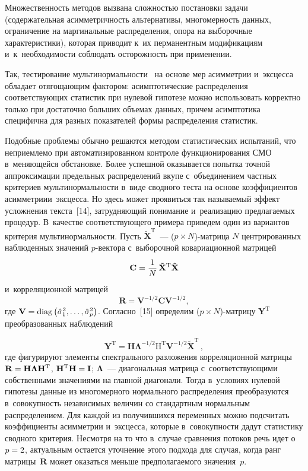 \begin{multicols}{2}
     Множественность методов вызвана сложностью постановки задачи 
(содержательная асим\-мет\-рич\-ность альтернативы, мно\-го\-мер\-ность данных, 
ограничение на маргинальные распределения, опора на выборочные 
характеристики), которая приводит к~их перманентным модификациям 
и~к~не\-об\-хо\-ди\-мости соблюдать осторожность при применении. 
     
     Так, тестирование муль\-ти\-нор\-маль\-ности~\cite[с.~5047--5051]{8-kri} на 
основе мер асим\-мет\-рии и~эксцесса обладает отя\-го\-ща\-ющим фактором: 
асимп\-то\-ти\-че\-ские распределения со\-от\-вет\-ст\-ву\-ющих статистик при нулевой 
гипотезе можно использовать корректно только при достаточно больших объемах 
данных, причем асимптотика специфична для разных показателей формы 
распределения статистик. 
     
     Подобные проблемы обычно решаются методом статистических испытаний, 
что неприемлемо при автоматизированном контроле функционирования СМО 
в~меняющейся обстановке. Более успешной оказывается попытка точной 
аппроксимации предельных распределений вкупе с~объединением частных 
критериев муль\-ти\-нор\-маль\-ности в~виде сводного тес\-та на основе коэффициентов 
асим\-мет\-рии\linebreak и~эксцесса. Но здесь может проявиться так называемый эффект 
услож\-не\-ния текс\-та~[14], за\-труд\-ня\-ющий понимание и~реализацию пред\-ла\-га\-емых 
процедур. В~качестве соответствующего примера \mbox{приведем} один из вариантов 
критерия мультинормальности. Пусть $\tilde{\mathbf{X}}^{\mathrm{T}}$~---  
($p\times N$)-мат\-ри\-ца $N$ центрированных наблюденных значений  
$p$-век\-то\-ра с~выборочной ковариационной матрицей 
$$
\mathbf{C}= \displaystyle\frac{\displaystyle 1\mathstrut}{\displaystyle N\mathstrut} \,\tilde{\mathbf{X}}^{\mathrm{T}}\tilde{\mathbf{X}}$$ 
и~корреляционной матрицей 
$$
\mathbf{R}= \mathbf{V}^{-1/2} \mathbf{CV}^{-1/2},
$$
 где $\mathbf{V}\hm= 
\mathrm{diag}\left( \hat{\sigma}^2_1, \ldots , \hat{\sigma}^2_p\right)$.
Согласно~[15] определим ($p\times N$)-мат\-ри\-цу $\mathbf{Y}^{\mathrm{T}}$ 
преобразованных наблюдений 

\noindent
$$
\mathbf{Y}^{\mathrm{T}}= \mathbf{H}\bm{\Lambda}^{-1/2} \mathrm{H}^{\mathrm{T}} \mathbf{V}^{-1/2} 
\tilde{\mathbf{X}}^{\mathrm{T}}\,,
$$
где фигурируют элементы спектрального разложения корреляционной матрицы 
$\mathbf{R}\hm= \mathbf{H}\bm{\Lambda} \mathbf{H}^{\mathrm{T}}$, 
$\mathbf{H}^{\mathrm{T}}\mathbf{H}\hm= \mathbf{I}$; $\bm{\Lambda}$~--- диагональная 
матрица с~со\-от\-вет\-ст\-ву\-ющи\-ми собственными значениями на глав\-ной диа\-го\-на\-ли. 
Тогда в~условиях нулевой гипотезы данные из многомерного нормального 
распределения преобразуются в~со\-во\-куп\-ность независимых величин со 
стандартным нормальным распределением. Для каждой из по\-лу\-чив\-ших\-ся 
переменных можно подсчитать коэффициенты асимметрии и~эксцесса, которые 
в~со\-во\-куп\-ности дадут статистику сводного критерия. Несмотря на то что в~случае 
сравнения потоков речь идет о~$p\hm=2$, актуальным остается уточ\-не\-ние этого 
подхода для случая, когда ранг мат\-ри\-цы~$\mathbf{R}$ может оказаться меньше 
пред\-по\-ла\-га\-емо\-го значения~$p$. 
     

\end{multicols}
